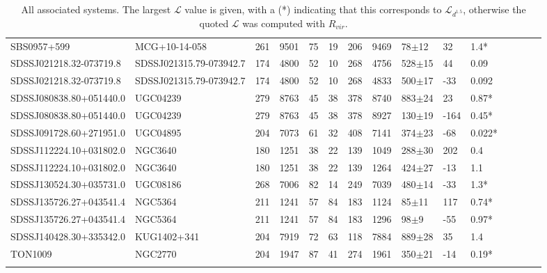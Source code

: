 \documentclass[iop]{emulateapj-rtx4}
\begin{document}
\begin{table}[ht]
\begin{center}
\begin{tabular}{l l l l l l l l l l l l l l l}
SBS0957+599  &  MCG+10-14-058  &  261  &  9501  &  75  &  19  &  206  &  9469  &  78$\pm$12  &  32  &  1.4*  \\
SDSSJ021218.32-073719.8  &  SDSSJ021315.79-073942.7  &  174  &  4800  &  52  &  10  &  268  &  4756  &  528$\pm$15  &  44  &  0.09  \\
SDSSJ021218.32-073719.8  &  SDSSJ021315.79-073942.7  &  174  &  4800  &  52  &  10  &  268  &  4833  &  500$\pm$17  &  -33  &  0.092  \\
SDSSJ080838.80+051440.0  &  UGC04239  &  279  &  8763  &  45  &  38  &  378  &  8740  &  883$\pm$24  &  23  &  0.87*  \\
SDSSJ080838.80+051440.0  &  UGC04239  &  279  &  8763  &  45  &  38  &  378  &  8927  &  130$\pm$19  &  -164  &  0.45*  \\
SDSSJ091728.60+271951.0  &  UGC04895  &  204  &  7073  &  61  &  32  &  408  &  7141  &  374$\pm$23  &  -68  &  0.022*  \\
SDSSJ112224.10+031802.0  &  NGC3640  &  180  &  1251  &  38  &  22  &  139  &  1049  &  288$\pm$30  &  202  &  0.4  \\
SDSSJ112224.10+031802.0  &  NGC3640  &  180  &  1251  &  38  &  22  &  139  &  1264  &  424$\pm$27  &  -13  &  1.1  \\
SDSSJ130524.30+035731.0  &  UGC08186  &  268  &  7006  &  82  &  14  &  249  &  7039  &  480$\pm$14  &  -33  &  1.3*  \\
SDSSJ135726.27+043541.4  &  NGC5364  &  211  &  1241  &  57  &  84  &  183  &  1124  &  85$\pm$11  &  117  &  0.74*  \\
SDSSJ135726.27+043541.4  &  NGC5364  &  211  &  1241  &  57  &  84  &  183  &  1296  &  98$\pm$9  &  -55  &  0.97*  \\
SDSSJ140428.30+335342.0  &  KUG1402+341  &  204  &  7919  &  72  &  63  &  118  &  7884  &  889$\pm$28  &  35  &  1.4  \\
TON1009  &  NGC2770  &  204  &  1947  &  87  &  41  &  274  &  1961  &  350$\pm$21  &  -14  &  0.19*  \\


 \\
\hline
\end{tabular}
\end{center}
  \caption{\small{All associated systems. The largest $\mathcal{L}$ value is given, with a (\**) indicating that this corresponds to $\mathcal{L}_{d^{1.5}}$, otherwise the quoted $\mathcal{L}$ was computed with $R_{vir}$.}}
  \label{target_table}
\end{table}
\end{document}
